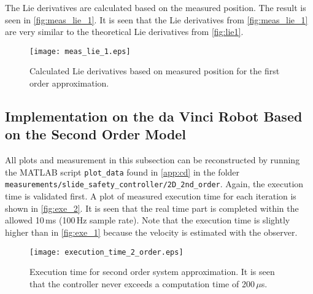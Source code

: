 The Lie derivatives are calculated based on the measured position. The result is seen in \autoref{fig:meas_lie_1}.
It is seen that the Lie derivatives from \autoref{fig:meas_lie_1} are very similar to the theoretical Lie derivatives from \autoref{fig:lie1}.

\begin{figure}[htbp]
\hspace{-3mm}
		\texttt{[image: meas\_lie\_1.eps]}
	\caption{Calculated Lie derivatives based on measured position for the first order approximation. }
    \label{fig:meas_lie_1}
\end{figure}


\subsection{Implementation on the da Vinci Robot Based on the Second Order Model}\label{subsec-implement-2dmodel}
\vspace{-1mm}
All plots and measurement in this subsection can be reconstructed by running the MATLAB script \texttt{plot\_data} found in \autoref{app:cd} in the folder \texttt{measurements/slide\_safety\_controller/2D\_2nd\_order}. Again, the execution time is validated first. A plot of measured execution time for each iteration is shown in \autoref{fig:exe_2}.
It is seen that the real time part is completed within the allowed 10\,ms (100\,Hz sample rate). Note that the execution time is slightly higher than in \autoref{fig:exe_1} because the velocity is estimated with the observer.


\begin{figure}[htbp]
	\center
		\texttt{[image: execution\_time\_2\_order.eps]}
	\caption{Execution time for second order system approximation. It is seen that the controller never exceeds a computation time of 200\,$\mu$s.}
	\label{fig:exe_2}
\end{figure}



